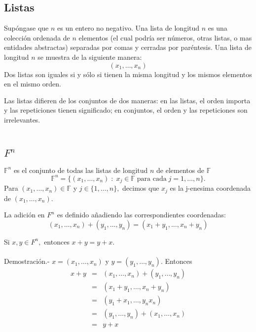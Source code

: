 \subsection{Listas}

\begin{tcolorbox}[colback=white]
    \begin{def.} 
	Supóngase que $n$ es un entero no negativo. Una lista de longitud $n$ es una colección ordenada de $n$ elementos (el cual podría ser números, otras listas, o mas entidades abstractas) separadas por comas y cerradas por paréntesis. Una lista de longitud $n$ se muestra de la siguiente manera:
	$$(x_1,\ldots,x_n)$$
	Dos listas son iguales si y sólo si tienen la misma longitud y los mismos elementos en el mismo orden.
    \end{def.}
\end{tcolorbox}
Las listas difieren de los conjuntos de dos maneras: en las listas, el orden importa y las repeticiones tienen significado; en conjuntos, el orden y las repeticiones son irrelevantes.\\\\

\subsection{\boldmath $F^n$}

\begin{tcolorbox}[colback=white]
    \begin{def.} 
	$\mathbb{F}^n$ es el conjunto de todas las listas de longitud $n$ de elementos de $\mathbb{F}$
	$$\mathbb{F}^n = \lbrace (x_1,\ldots, x_n)\; : \; x_j \in \mathbb{F} \; \mbox{para cada}\; j = 1,\ldots, n\rbrace.$$
	Para $(x_1,\ldots, x_n)\in \mathbb{F}$ y $j\in \lbrace 1, \ldots, n\rbrace,$ decimos que $x_j$ es la j-enesima coordenada de $(x_1,\ldots, x_n)$.
    \end{def.}
\end{tcolorbox}

\begin{tcolorbox}[colback=white]
    \begin{def.}
	La adición en $F^n$ es definido añadiendo las correspondientes coordenadas: 
	$$(x_1,\ldots,x_n)+(y_1,\ldots, y_n)=(x_1+y_1,\ldots, x_n + y_n)$$
    \end{def.}
\end{tcolorbox}

\begin{teo}
    Si $x,y \in F^n,$ entonces $x+y=y+x$.\\\\
    Demostración.-\; $x=(x_1,\ldots, x_n)$ y $y=(y_1,\ldots, y_n)$. Entonces
    $$\begin{array}{rcl}
	x+y&=&(x_1,\ldots,x_n)+(y_1,\ldots,y_n)\\
	   &=&(x_1+y_1,\ldots, x_n + y_n)\\
	   &=&(y_1+x_1,\ldots, y_n x_n)\\
	   &=&(y_1,\ldots,y_n)+(x_1,\ldots,x_n)\\
	   &=&y+x\\
    \end{array}$$
\end{teo}

